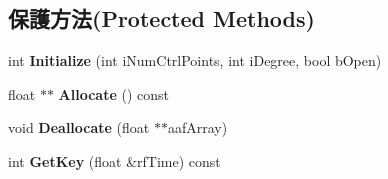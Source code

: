 \subsection*{保護方法(Protected Methods)}
\begin{DoxyCompactItemize}
\item 
int {\bfseries Initialize} (int i\+Num\+Ctrl\+Points, int i\+Degree, bool b\+Open)\hypertarget{class_i_dream_sky_1_1_b_spline_basis_ad321121da12ccbcfdaa4095fc07649dc}{}\label{class_i_dream_sky_1_1_b_spline_basis_ad321121da12ccbcfdaa4095fc07649dc}

\item 
float $\ast$$\ast$ {\bfseries Allocate} () const \hypertarget{class_i_dream_sky_1_1_b_spline_basis_abcd39eb682099af2a037df3be8d4590a}{}\label{class_i_dream_sky_1_1_b_spline_basis_abcd39eb682099af2a037df3be8d4590a}

\item 
void {\bfseries Deallocate} (float $\ast$$\ast$aaf\+Array)\hypertarget{class_i_dream_sky_1_1_b_spline_basis_a6196de873aacc4bc58a9bc4e01824f98}{}\label{class_i_dream_sky_1_1_b_spline_basis_a6196de873aacc4bc58a9bc4e01824f98}

\item 
int {\bfseries Get\+Key} (float \&rf\+Time) const \hypertarget{class_i_dream_sky_1_1_b_spline_basis_a3b81e8c2fa4ee6c5e8f05f114f87c7b5}{}\label{class_i_dream_sky_1_1_b_spline_basis_a3b81e8c2fa4ee6c5e8f05f114f87c7b5}

\end{DoxyCompactItemize}
